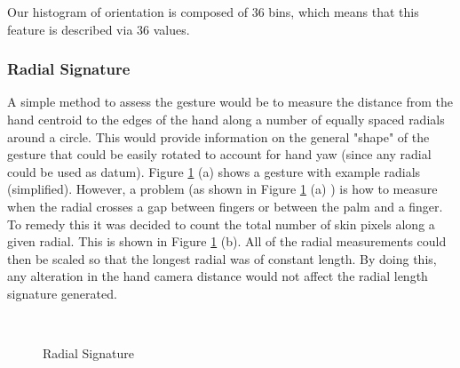 Our histogram of orientation is composed of 36 bins, which means that this feature is described via 36 values.
\bigskip
\subsubsection{Radial Signature}
A simple method to assess the gesture would be to measure the distance from the hand centroid to the edges of the hand along a number of equally spaced radials \cite{feature4} around a circle. This would provide information on the general "shape" of the gesture that could be easily rotated to account for hand yaw (since any radial could be used as datum).
\bigskip
Figure \ref{fig:radial_sig} (a) shows a gesture with example radials (simplified).
However, a problem (as shown in Figure \ref{fig:radial_sig} (a) ) is how to measure when the radial crosses a gap between fingers or between the palm and a finger. To remedy this it was decided to count the total number of skin pixels along a given radial. This is shown in Figure \ref{fig:radial_sig} (b). All of the radial measurements could then be scaled so that the longest radial was of constant length. By doing this, any alteration in the hand camera distance would not affect the radial length signature generated.

\begin{figure}[h]
\begin{dBox}
\centering
  \mbox{
   }
   \caption{Radial Signature \cite{feature4} \label{fig:radial_sig} }   
\end{dBox}   
\end{figure}

